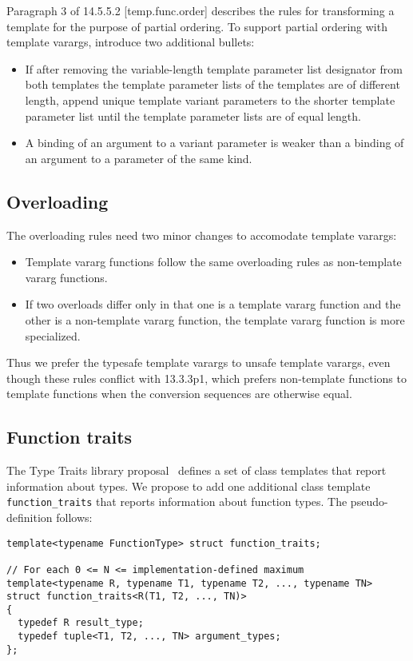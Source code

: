 \documentclass{article}
\begin{document}
Paragraph 3 of 14.5.5.2 [temp.func.order] describes the rules for
transforming a template for the purpose of partial ordering. To
support partial ordering with template varargs, introduce two
additional bullets:
\begin{itemize}
\item If after removing the variable-length template parameter list
  designator from both templates the template parameter lists of the
  templates are of different length, append unique template variant
  parameters to the shorter template parameter list until the template
  parameter lists are of equal length.
\item A binding of an argument to a variant parameter is weaker than a
  binding of an argument to a parameter of the same kind.
\end{itemize}

\subsection{Overloading}
\label{overloading}
The overloading rules need two minor changes to accomodate template
varargs:
\begin{itemize}
\item Template vararg functions follow the same overloading rules as
  non-template vararg functions.
\item If two overloads differ only in that one is a template vararg
  function and the other is a non-template vararg function, the
  template vararg function is more specialized.
\end{itemize}

Thus we prefer the typesafe template varargs to unsafe template
varargs, even though these rules conflict with 13.3.3p1,
which prefers non-template functions to template functions when the
conversion sequences are otherwise equal. 

\subsection{Function traits}
The Type Traits library proposal~\cite{Maddock03} defines a set of
class templates that report information about types. We propose to add
one additional class template {\tt function\_traits} that reports
information about function types. The pseudo-definition follows:
\begin{verbatim}
template<typename FunctionType> struct function_traits;

// For each 0 <= N <= implementation-defined maximum
template<typename R, typename T1, typename T2, ..., typename TN>
struct function_traits<R(T1, T2, ..., TN)>
{
  typedef R result_type;
  typedef tuple<T1, T2, ..., TN> argument_types;
};
\end{verbatim}
\end{document}
